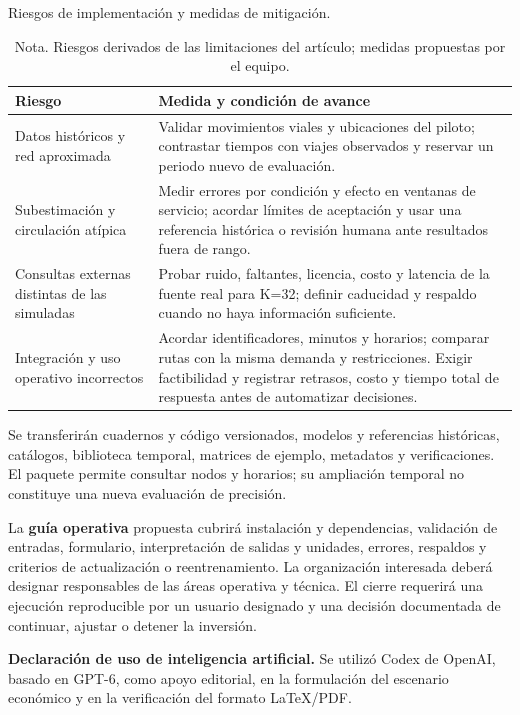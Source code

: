 \documentclass[letterpaper,11pt]{article}
\begin{document}
\begin{table}[h!]
\centering\caption{Riesgos de implementación y medidas de mitigación.}
\begin{tabularx}{\linewidth}{@{}p{.29\linewidth}Y@{}}\toprule
Riesgo & Medida y condición de avance\\\midrule
Datos históricos y red aproximada & Validar movimientos viales y ubicaciones del piloto; contrastar tiempos con viajes observados y reservar un periodo nuevo de evaluación.\\[5pt]
Subestimación y circulación atípica & Medir errores por condición y efecto en ventanas de servicio; acordar límites de aceptación y usar una referencia histórica o revisión humana ante resultados fuera de rango.\\[5pt]
Consultas externas distintas de las simuladas & Probar ruido, faltantes, licencia, costo y latencia de la fuente real para K=32; definir caducidad y respaldo cuando no haya información suficiente.\\[5pt]
Integración y uso operativo incorrectos & Acordar identificadores, minutos y horarios; comparar rutas con la misma demanda y restricciones. Exigir factibilidad y registrar retrasos, costo y tiempo total de respuesta antes de automatizar decisiones.\\\bottomrule
\end{tabularx}
\caption*{Nota. Riesgos derivados de las limitaciones del artículo; medidas propuestas por el equipo.}
\end{table}

Se transferirán cuadernos y código versionados, modelos y referencias históricas, catálogos, biblioteca temporal, matrices de ejemplo, metadatos y verificaciones. El paquete permite consultar nodos y horarios; su ampliación temporal no constituye una nueva evaluación de precisión.

La \textbf{guía operativa} propuesta cubrirá instalación y dependencias, validación de entradas, formulario, interpretación de salidas y unidades, errores, respaldos y criterios de actualización o reentrenamiento. La organización interesada deberá designar responsables de las áreas operativa y técnica. El cierre requerirá una ejecución reproducible por un usuario designado y una decisión documentada de continuar, ajustar o detener la inversión.

\noindent\textbf{Declaración de uso de inteligencia artificial.} Se utilizó Codex de OpenAI, basado en GPT-6, como apoyo editorial, en la formulación del escenario económico y en la verificación del formato LaTeX/PDF.
\end{document}
